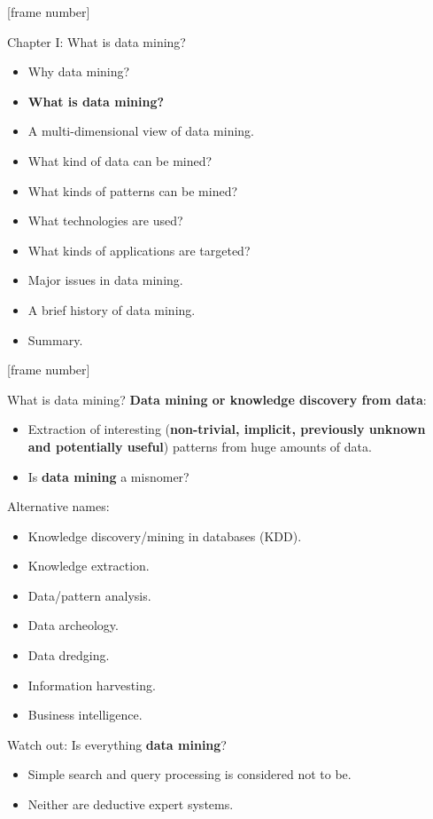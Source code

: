 \documentclass[aspectratio=169,t]{beamer}
\begin{document}
  {
    [frame number]
    \begin{frame}{Chapter I: What is data mining?}
        \begin{itemize}
            \item Why data mining?
            \item \textbf{What is data mining?}
            \item A multi-dimensional view of data mining.
            \item What kind of data can be mined?
            \item What kinds of patterns can be mined?
            \item What technologies are used?
            \item What kinds of applications are targeted?
            \item Major issues in data mining.
            \item A brief history of data mining.
            \item Summary.
        \end{itemize}
    \end{frame}
  }

  {
    [frame number]
    \begin{frame}{What is data mining?}
    \textbf{Data mining or knowledge discovery from data}:
        \begin{itemize}
            \item Extraction of interesting (\textbf{non-trivial, implicit, previously unknown \\
                  and potentially useful}) patterns from huge amounts of data.
            \item Is \textbf{data mining} a misnomer?
        \end{itemize}
    Alternative names:
        \begin{itemize}
            \item Knowledge discovery/mining in databases (KDD).
            \item Knowledge extraction.
            \item Data/pattern analysis.
            \item Data archeology.
            \item Data dredging.
            \item Information harvesting.
            \item Business intelligence.
        \end{itemize}
    Watch out: Is everything \textbf{data mining}?
        \begin{itemize}
            \item Simple search and query processing is considered not to be.
            \item Neither are deductive expert systems.
        \end{itemize}
    \end{frame}
  }
\end{document}
